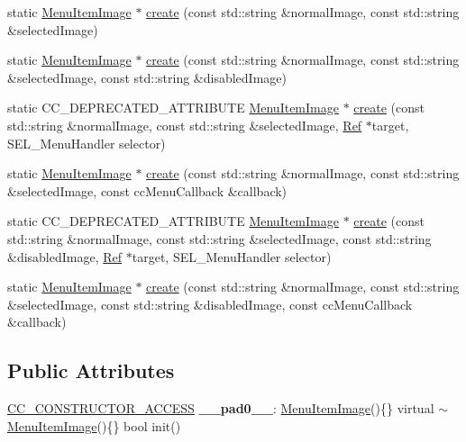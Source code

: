 \begin{DoxyCompactItemize}
\item 
static \hyperlink{classMenuItemImage}{Menu\+Item\+Image} $\ast$ \hyperlink{classMenuItemImage_af7f7689def7d0eb1a8073b3a4293dd29}{create} (const std\+::string \&normal\+Image, const std\+::string \&selected\+Image)
\item 
static \hyperlink{classMenuItemImage}{Menu\+Item\+Image} $\ast$ \hyperlink{classMenuItemImage_af2ec388e058cb037959748c4db1daa63}{create} (const std\+::string \&normal\+Image, const std\+::string \&selected\+Image, const std\+::string \&disabled\+Image)
\item 
static C\+C\+\_\+\+D\+E\+P\+R\+E\+C\+A\+T\+E\+D\+\_\+\+A\+T\+T\+R\+I\+B\+U\+TE \hyperlink{classMenuItemImage}{Menu\+Item\+Image} $\ast$ \hyperlink{classMenuItemImage_ae16b8121290111a15221ddd9070ebd9a}{create} (const std\+::string \&normal\+Image, const std\+::string \&selected\+Image, \hyperlink{classRef}{Ref} $\ast$target, S\+E\+L\+\_\+\+Menu\+Handler selector)
\item 
static \hyperlink{classMenuItemImage}{Menu\+Item\+Image} $\ast$ \hyperlink{classMenuItemImage_aa6212bd476d3c22af8b05c821dcec2af}{create} (const std\+::string \&normal\+Image, const std\+::string \&selected\+Image, const cc\+Menu\+Callback \&callback)
\item 
static C\+C\+\_\+\+D\+E\+P\+R\+E\+C\+A\+T\+E\+D\+\_\+\+A\+T\+T\+R\+I\+B\+U\+TE \hyperlink{classMenuItemImage}{Menu\+Item\+Image} $\ast$ \hyperlink{classMenuItemImage_a7f73a04161580bced4860e557bc4be99}{create} (const std\+::string \&normal\+Image, const std\+::string \&selected\+Image, const std\+::string \&disabled\+Image, \hyperlink{classRef}{Ref} $\ast$target, S\+E\+L\+\_\+\+Menu\+Handler selector)
\item 
static \hyperlink{classMenuItemImage}{Menu\+Item\+Image} $\ast$ \hyperlink{classMenuItemImage_aa4bbe8466bf9fd726ba7283058dd975b}{create} (const std\+::string \&normal\+Image, const std\+::string \&selected\+Image, const std\+::string \&disabled\+Image, const cc\+Menu\+Callback \&callback)
\end{DoxyCompactItemize}
\subsection*{Public Attributes}
\begin{DoxyCompactItemize}
\item 
\mbox{\label{classMenuItemImage_a2f6ca5724605ddcc1ae5d019ae1d0734}} 
\hyperlink{_2cocos2d_2cocos_2base_2ccConfig_8h_a25ef1314f97c35a2ed3d029b0ead6da0}{C\+C\+\_\+\+C\+O\+N\+S\+T\+R\+U\+C\+T\+O\+R\+\_\+\+A\+C\+C\+E\+SS} {\bfseries \+\_\+\+\_\+pad0\+\_\+\+\_\+}\+: \hyperlink{classMenuItemImage}{Menu\+Item\+Image}()\{\} virtual $\sim$\hyperlink{classMenuItemImage}{Menu\+Item\+Image}()\{\} bool init()
\end{DoxyCompactItemize}
